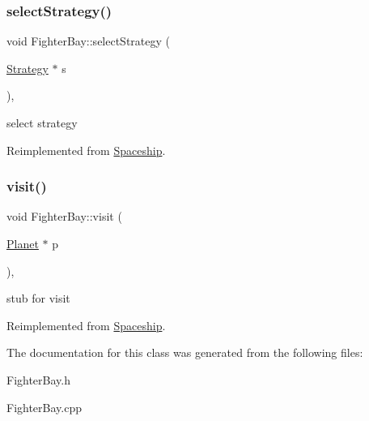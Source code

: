 \subsubsection{\texorpdfstring{select\+Strategy()}{selectStrategy()}}
{\footnotesize\ttfamily void Fighter\+Bay\+::select\+Strategy (\begin{DoxyParamCaption}\item[{\hyperlink{classStrategy}{Strategy} $\ast$}]{s }\end{DoxyParamCaption})\hspace{0.3cm}{\ttfamily [inline]}, {\ttfamily [virtual]}}

select strategy 

Reimplemented from \hyperlink{classSpaceship_a93be2d9d2b675ef978d866d4cd7a6524}{Spaceship}.

\mbox{\label{classFighterBay_ac0a0c1629ee0b28ade380e88774bbad4}} 
\subsubsection{\texorpdfstring{visit()}{visit()}}
{\footnotesize\ttfamily void Fighter\+Bay\+::visit (\begin{DoxyParamCaption}\item[{\hyperlink{classPlanet}{Planet} $\ast$}]{p }\end{DoxyParamCaption})\hspace{0.3cm}{\ttfamily [inline]}, {\ttfamily [virtual]}}

stub for visit 

Reimplemented from \hyperlink{classSpaceship}{Spaceship}.



The documentation for this class was generated from the following files\+:\begin{DoxyCompactItemize}
\item 
Fighter\+Bay.\+h\item 
Fighter\+Bay.\+cpp\end{DoxyCompactItemize}
